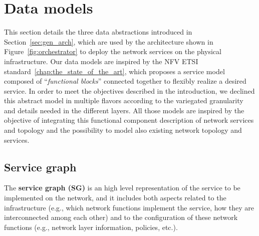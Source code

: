 \chapter{Data models}
\label{chap:data_model}
\label{sec:data_model}

This section details the three data abstractions introduced in Section~\ref{sec:gen_arch}, which are  used by the architecture shown in Figure~\ref{fig:orchestrator} to deploy the network services on the physical infrastructure. 
Our data models are inspired by the NFV ETSI standard~\ref{chap:the_state_of_the_art}, which proposes a service model composed of ``\textit{functional blocks}'' connected together to flexibly realize a desired service.
In order to meet the objectives described in the introduction, we declined this abstract model in multiple flavors according to the variegated granularity and details needed in the different layers.
All those models are inspired by the objective of integrating this functional component description of network services and topology and the possibility to model also existing network topology and services.  


\section{Service graph}
\label{sec:service_graph}

The \textbf{service graph (SG)} is an high level representation of the service to be implemented on the network, and it includes both aspects related to the infrastructure (e.g., which network functions implement the service, how they are interconnected among each other) %
and to the configuration of these network functions (e.g., network layer information, policies, etc.).


